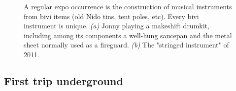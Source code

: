 \begin{figure}[t!]
\begin{subfigure}[t]{0.49\textwidth}
			\caption{}\label{Bivi Stringed Instrument}
		\end{subfigure}
		\caption{A regular expo occurrence is the construction of musical instruments from bivi items (old Nido tins, tent poles, etc). Every bivi instrument is unique.
  \textit{(a)} Jonny playing a makeshift drumkit, including among its components a well-hung saucepan and the metal sheet normally used as a fireguard.
  \textit{(b)} The "stringed instrument" of 2011. }
	\end{figure}



\subsection{First trip underground}

